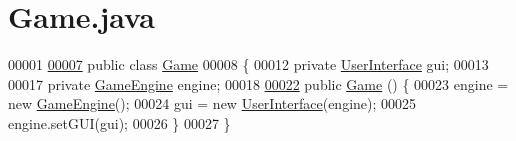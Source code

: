 \hypertarget{Game_8java_source}{\section{Game.\-java}
}

\begin{DoxyCode}
00001 
\hypertarget{Game_8java_source_l00007}{}\hyperlink{classGame}{00007} \textcolor{keyword}{public} \textcolor{keyword}{class }\hyperlink{classGame}{Game}
00008 \{
00012     \textcolor{keyword}{private} \hyperlink{classUserInterface}{UserInterface} gui;
00013 
00017     \textcolor{keyword}{private} \hyperlink{classGameEngine}{GameEngine} engine;
00018 
\hypertarget{Game_8java_source_l00022}{}\hyperlink{classGame_a2e034e53e9c032964ecd2a831b29a616}{00022}     \textcolor{keyword}{public} \hyperlink{classGame_a2e034e53e9c032964ecd2a831b29a616}{Game} () \{
00023         engine = \textcolor{keyword}{new} \hyperlink{classGameEngine}{GameEngine}();
00024         gui = \textcolor{keyword}{new} \hyperlink{classUserInterface}{UserInterface}(engine);
00025         engine.setGUI(gui);
00026     \}
00027 \}
\end{DoxyCode}
